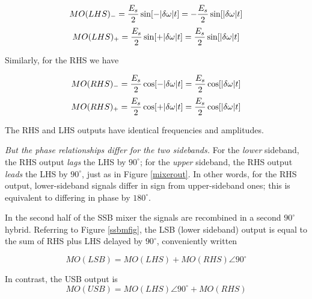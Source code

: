 \documentclass[11pt,preprint]{aastex}
\begin{document}
\begin{mathletters} \label{rhs}
\begin{equation}
MO(LHS)_- = {E_s \over 2} \sin [-|\delta \omega | t] =
   -{E_s \over 2} \sin [|\delta \omega | t]
\end{equation}
\begin{equation}
MO(LHS)_+ = {E_s \over 2} \sin [+|\delta \omega | t] =
   {E_s \over 2} \sin [|\delta \omega | t]
\end{equation}
\end{mathletters}

\noindent Similarly, for the RHS we have

\begin{mathletters} \label{lhs}
\begin{equation}
MO(RHS)_- = {E_s \over 2} \cos [-|\delta \omega | t] =
   {E_s \over 2} \cos [|\delta \omega | t]
\end{equation}
\begin{equation}
MO(RHS)_+ = {E_s \over 2} \cos [+|\delta \omega | t] =
   {E_s \over 2} \cos [|\delta \omega | t]
\end{equation}
\end{mathletters}

\noindent The RHS and LHS outputs have identical frequencies and
amplitudes.


        {\it But the phase relationships differ for the two sidebands.}
For the {\it lower} sideband, the RHS output {\it lags} the LHS by
$90^\circ$; for the {\it upper} sideband, the RHS output {\it leads} the
LHS by $90^\circ$, just as in Figure \ref{mixerout}. In other words, for
the RHS output, lower-sideband signals differ in sign from
upper-sideband ones; this is equivalent to differing in phase by
$180^\circ$.

        In the second half of the SSB mixer the signals are recombined
in a second $90^\circ$ hybrid. Referring to Figure \ref{ssbmfig}, the
LSB (lower sideband) output is equal to the sum of RHS plus LHS delayed
by $90^\circ$, conveniently written

\begin{mathletters}
\begin{equation}
MO(LSB) = MO(LHS) + MO(RHS) \angle 90^\circ
\end{equation}

\noindent In contrast, the USB output is
\begin{equation}
MO(USB) = MO(LHS)\angle 90^\circ + MO(RHS)
\end{equation}
\end{mathletters}
\end{document}
